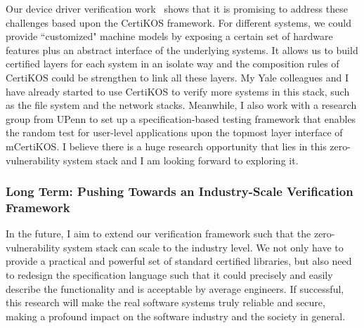 \documentclass[a4paper, 10pt]{article}
\begin{document}
\begin{small}
Our device driver verification work~\cite{pldi16-device} shows that
it is promising to address these challenges based upon the CertiKOS framework. For different systems, we could
provide ``customized" machine models
by exposing a certain set of hardware features
plus an abstract interface of the underlying systems.
It allows us to build certified layers for each system
in an isolate way and the  composition rules of CertiKOS
could be strengthen to link all these layers. My Yale colleagues
and I have already started to use CertiKOS to verify more systems in this stack,
such as the file system and the network stacks.
Meanwhile, I also work with  a research group from UPenn to
set up a specification-based testing framework
that enables the random test for user-level applications upon the topmost layer interface of mCertiKOS.
I believe there is a huge research opportunity that
lies in this zero-vulnerability system stack
and I am looking forward to exploring it.


\subsubsection*{\small Long Term: Pushing Towards  an Industry-Scale Verification Framework}
In the future, I aim to 
extend our verification framework such that
the  zero-vulnerability system stack can scale to the industry level. We not only have to provide a practical and powerful
set of standard certified libraries, but also need to redesign
the specification language such that
it could precisely and easily describe the functionality
and is acceptable by average engineers.
If successful,
this research will make
the real software systems truly reliable and secure, making  a profound impact on the software industry
 and the society in general.
 
\vspace{0.5cm}

\end{small}
\end{document}
